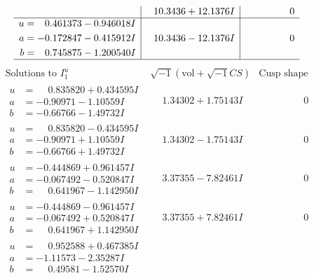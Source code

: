 \documentclass[1p]{elsarticle_modified}
\theoremstyle{definition}
\newcommand{\I}{\sqrt{-1}}
\begin{document}
$$\begin{array}{c|c|c}
 & \phantom{-}10.3436 + 12.1376 I & \phantom{-0.000000 } 0 \\ \hline\begin{aligned}
u &= \phantom{-}0.461373 - 0.946018 I \\
a &= -0.172847 - 0.415912 I \\
b &= \phantom{-}0.745875 - 1.200540 I\end{aligned}
 & \phantom{-}10.3436 - 12.1376 I & \phantom{-0.000000 } 0\\
 \hline 
 \end{array}$$\newpage$$\begin{array}{c|c|c}  
\text{Solutions to }I^u_{1}& \I (\text{vol} + \sqrt{-1}CS) & \text{Cusp shape}\\
 \hline 
\begin{aligned}
u &= \phantom{-}0.835820 + 0.434595 I \\
a &= -0.90971 - 1.10559 I \\
b &= -0.66766 - 1.49732 I\end{aligned}
 & \phantom{-}1.34302 + 1.75143 I & \phantom{-0.000000 } 0 \\ \hline\begin{aligned}
u &= \phantom{-}0.835820 - 0.434595 I \\
a &= -0.90971 + 1.10559 I \\
b &= -0.66766 + 1.49732 I\end{aligned}
 & \phantom{-}1.34302 - 1.75143 I & \phantom{-0.000000 } 0 \\ \hline\begin{aligned}
u &= -0.444869 + 0.961457 I \\
a &= -0.067492 - 0.520847 I \\
b &= \phantom{-}0.641967 - 1.142950 I\end{aligned}
 & \phantom{-}3.37355 - 7.82461 I & \phantom{-0.000000 } 0 \\ \hline\begin{aligned}
u &= -0.444869 - 0.961457 I \\
a &= -0.067492 + 0.520847 I \\
b &= \phantom{-}0.641967 + 1.142950 I\end{aligned}
 & \phantom{-}3.37355 + 7.82461 I & \phantom{-0.000000 } 0 \\ \hline\begin{aligned}
u &= \phantom{-}0.952588 + 0.467385 I \\
a &= -1.11573 - 2.35287 I \\
b &= \phantom{-}0.49581 - 1.52570 I\end{aligned}

\end{array}$$
\end{document}
